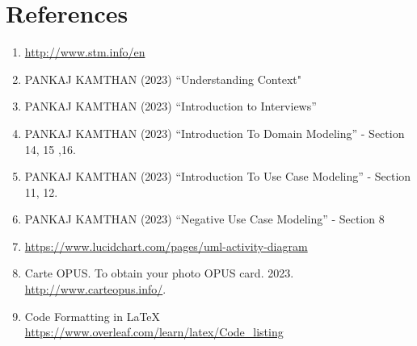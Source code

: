 \documentclass[a4paper,12pt]{report}
\begin{document}
\chapter{References}
\begin{enumerate}
  \item \url{http://www.stm.info/en}
  \item PANKAJ KAMTHAN (2023) “Understanding Context"
  \item PANKAJ KAMTHAN (2023) “Introduction to Interviews”
  \item PANKAJ KAMTHAN (2023) “Introduction To Domain Modeling” - Section 14, 15 ,16.
  \item PANKAJ KAMTHAN (2023) “Introduction To Use Case Modeling” - Section 11, 12.
  \item PANKAJ KAMTHAN (2023) “Negative Use Case Modeling”  - Section 8
  \item \url{https://www.lucidchart.com/pages/uml-activity-diagram}
  \item Carte OPUS. To obtain your photo OPUS card. 2023. \url{http://www.carteopus.info/}.
  \item Code Formatting in LaTeX \url{https://www.overleaf.com/learn/latex/Code_listing}
\end{enumerate}
\end{document}
